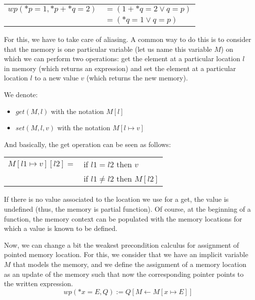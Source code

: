 \begin{tabular}{ll}
$wp(*p = 1, *p + *q = 2)$ & $= (1 + *q = 2 \vee q = p)$\\
                          & $= (*q = 1 \vee q = p)$
\end{tabular}



For this, we have to take care of aliasing. A common way to do this is to
consider that the memory is one particular variable (let us name this variable
$M$) on which we can perform two operations: get the element at a particular
location $l$ in memory (which returns an expression) and set the element at a
particular location $l$ to a new value $v$ (which returns the new memory).


We denote:


\begin{itemize}
\item $get(M,l)$ with the notation $M[l]$
\item $set(M,l,v)$ with the notation $M[l \mapsto v]$
\end{itemize}


And basically, the get operation can be seen as follows:


\begin{tabular}{ll}
  $M[l1 \mapsto v][l2] =$ & if $l1   =  l2$ then $v$ \\
                          & if $l1 \neq l2$ then $M[l2]$
\end{tabular}


If there is no value associated to the location we use for a get, the value is
undefined (thus, the memory is partial function). Of course, at the beginning of
a function, the memory context can be populated with the memory locations for
which a value is known to be defined.


Now, we can change a bit the weakest precondition calculus for assignment
of pointed memory location. For this, we consider that we have an implicit
variable $M$ that models the memory, and we define the assignment of a memory
location as an update of the memory such that now the corresponding pointer points
to the written expression.
$$wp(*x = E, Q) := Q[M \leftarrow M[x \mapsto E]]$$


